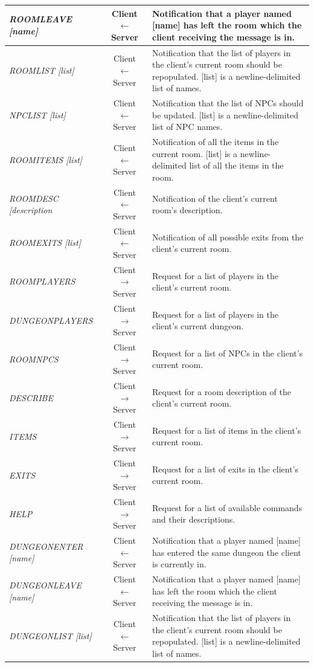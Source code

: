 \documentclass[a4paper]{article}
\begin{document}
\begin{appendices}
\begin{longtable}{|l|c|p{8 cm}|}
\hline
\textit{ROOMLEAVE [name]} & Client $\leftarrow$ Server & Notification that a player named [name] has left the room which the client receiving the message is in.\\
\hline
\textit{ROOMLIST [list]} & Client $\leftarrow$ Server & Notification that the list of players in the client's current room should be repopulated. [list] is a newline-delimited list of names.\\
\hline
\textit{NPCLIST [list]}  & Client $\leftarrow$ Server & Notification that the list of NPCs should be updated. [list] is a newline-delimited list of NPC names.\\
\hline
\textit{ROOMITEMS [list]} & Client $\leftarrow$ Server & Notification of all the items in the current room. [list] is a newline- delimited list of all the items in the room.\\
\hline
\textit{ROOMDESC [description} & Client $\leftarrow$ Server & Notification of the client's current room's description.\\
\hline
\textit{ROOMEXITS [list]} & Client $\leftarrow$ Server & Notification of all possible exits from the client's current room.\\
\hline
\textit{ROOMPLAYERS} & Client $\rightarrow$ Server & Request for a list of players in the client's current room.\\
\hline
\textit{DUNGEONPLAYERS} & Client $\rightarrow$ Server & Request for a list of players in the client's current dungeon.\\
\hline
\textit{ROOMNPCS} & Client $\rightarrow$ Server & Request for a list of NPCs in the client's current room.\\
\hline
\textit{DESCRIBE} & Client $\rightarrow$ Server & Request for a room description of the client's current room.\\
\hline
\textit{ITEMS} & Client $\rightarrow$ Server & Request for a list of items in the client's current room.\\
\hline
\textit{EXITS} & Client $\rightarrow$ Server & Request for a list of exits in the client's current room.\\
\hline
\textit{HELP} & Client $\rightarrow$ Server & Request for a list of available commands and their descriptions.\\
\hline
\textit{DUNGEONENTER [name]} & Client $\leftarrow$ Server & Notification that a player named [name] has entered the same dungeon the client is currently in.\\
\hline
\textit{DUNGEONLEAVE [name]} & Client $\leftarrow$ Server & Notification that a player named [name] has left the room which the client receiving the message is in.\\
\hline
\textit{DUNGEONLIST [list]} & Client $\leftarrow$ Server & Notification that the list of players in the client's current room should be repopulated. [list] is a newline-delimited list of names.\\
\hline
\end{longtable}
\end{appendices}
\end{document}
